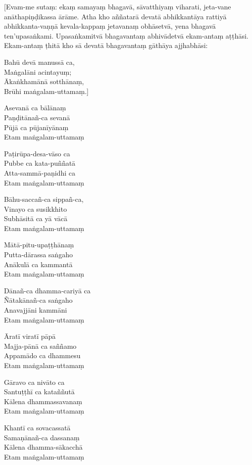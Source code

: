 [Evam-me sutaṃ: ekaṃ samayaṃ bhagavā, sāvatthiyaṃ viharati, jeta-vane
anāthapiṇḍikassa ārāme. Atha kho aññatarā devatā abhikkantāya rattiyā
abhikkanta-vaṇṇā kevala-kappaṃ jetavanaṃ obhāsetvā, yena bhagavā ten'upasaṅkami.
Upasaṅkamitvā bhagavantaṃ abhivādetvā ekam-antaṃ aṭṭhāsi. Ekam-antaṃ ṭhitā kho
sā devatā bhagavantaṃ gāthāya ajjhabhāsi:

Bahū devā manussā ca,\\
Maṅgalāni acintayuṃ;\\
Ākaṅkhamānā sotthānaṃ,\\
Brūhi maṅgalam-uttamaṃ.]

\bigskip

\begin{paritta}
Asevanā ca bālānaṃ\\
Paṇḍitānañ-ca sevanā\\
Pūjā ca pūjanīyānaṃ\\
Etam maṅgalam-uttamaṃ

Paṭirūpa-desa-vāso ca\\
Pubbe ca kata-puññatā\\
Atta-sammā-paṇidhi ca\\
Etam maṅgalam-uttamaṃ

Bāhu-saccañ-ca sippañ-ca,\\
Vinayo ca susikkhito\\
Subhāsitā ca yā vācā\\
Etam maṅgalam-uttamaṃ

Mātā-pitu-upaṭṭhānaṃ\\
Putta-dārassa saṅgaho\\
Anākulā ca kammantā\\
Etam maṅgalam-uttamaṃ

Dānañ-ca dhamma-cariyā ca\\
Ñātakānañ-ca saṅgaho\\
Anavajjāni kammāni\\
Etam maṅgalam-uttamaṃ

Āratī viratī pāpā\\
Majja-pānā ca saññamo\\
Appamādo ca dhammesu\\
Etam maṅgalam-uttamaṃ

Gāravo ca nivāto ca\\
Santuṭṭhī ca kataññutā\\
Kālena dhammassavanaṃ\\
Etam maṅgalam-uttamaṃ

Khantī ca sovacassatā\\
Samaṇānañ-ca dassanaṃ\\
Kālena dhamma-sākacchā\\
Etam maṅgalam-uttamaṃ


\end{paritta}
